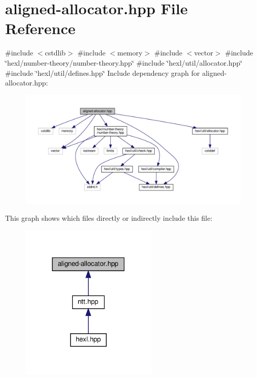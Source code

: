 \hypertarget{aligned-allocator_8hpp}{}\section{aligned-\/allocator.hpp File Reference}
\label{aligned-allocator_8hpp}
{\ttfamily \#include $<$cstdlib$>$}\newline
{\ttfamily \#include $<$memory$>$}\newline
{\ttfamily \#include $<$vector$>$}\newline
{\ttfamily \#include \char`\"{}hexl/number-\/theory/number-\/theory.\+hpp\char`\"{}}\newline
{\ttfamily \#include \char`\"{}hexl/util/allocator.\+hpp\char`\"{}}\newline
{\ttfamily \#include \char`\"{}hexl/util/defines.\+hpp\char`\"{}}\newline
Include dependency graph for aligned-\/allocator.hpp\+:
\nopagebreak
\begin{figure}[H]
\begin{center}
\leavevmode
\includegraphics[width=350pt]{aligned-allocator_8hpp__incl}
\end{center}
\end{figure}
This graph shows which files directly or indirectly include this file\+:
\nopagebreak
\begin{figure}[H]
\begin{center}
\leavevmode
\includegraphics[width=186pt]{aligned-allocator_8hpp__dep__incl}
\end{center}
\end{figure}
